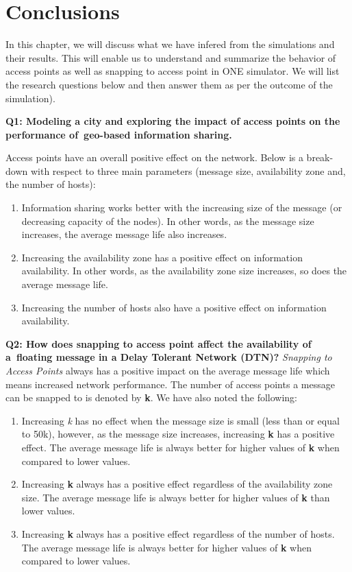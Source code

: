 
\chapter{Conclusions}\label{chapter:conclusions}
In this chapter, we will discuss what we have infered from the simulations and their results. This will enable us to understand and summarize the behavior of access points as well as snapping to access point in ONE simulator. We will list the research questions below and then answer them as per the outcome of the simulation).\newline

\textbf{Q1: Modeling a city and exploring the impact of access points on the performance of geo-based information sharing.} \newline

Access points have an overall positive effect on the network. Below is a break-down with respect to three main parameters (message size, availability zone and, the number of hosts):

\begin{enumerate}
  \item Information sharing works better with the increasing size of the message (or decreasing capacity of the nodes). In other words, as the message size increases, the average message life also increases.
  \item Increasing the availability zone has a positive effect on information availability. In other words, as the availability zone size increases, so does the average message life.
  \item Increasing the number of hosts also have a positive effect on information availability.
\end{enumerate}
\vspace{4mm}
\textbf{Q2: How does snapping to access point affect the availability of a floating message in a Delay Tolerant Network (DTN)?}\newline
\textit{Snapping to Access Points} always has a positive impact on the average message life which means increased network performance. The number of access points a message can be snapped to is denoted by \textbf{k}. We have also noted the following:
\begin{enumerate}
  \item Increasing \textit{k} has no effect when the message size is small (less than or equal to 50k), however, as the message size increases, increasing \textbf{k} has a positive effect. The average message life is always better for higher values of \textbf{k} when compared to lower values.
  \item Increasing \textbf{k} always has a positive effect regardless of the availability zone size. The average message life is always better for higher values of \textbf{k} than lower values.
  \item Increasing \textbf{k} always has a positive effect regardless of the number of hosts. The average message life is always better for higher values of \textbf{k} when compared to lower values.
\end{enumerate}
